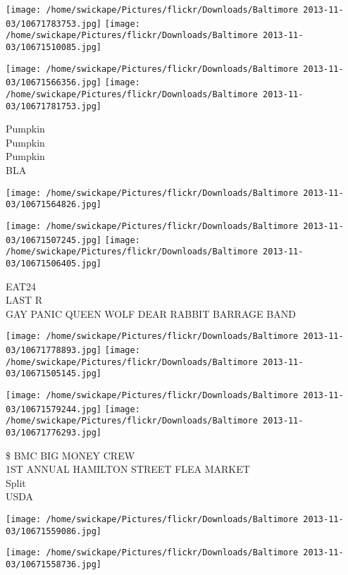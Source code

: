 \documentclass[10pt,letterpaper]{article}
\begin{document}
\texttt{[image: /home/swickape/Pictures/flickr/Downloads/Baltimore 2013-11-03/10671783753.jpg]}
\texttt{[image: /home/swickape/Pictures/flickr/Downloads/Baltimore 2013-11-03/10671510085.jpg]}

\texttt{[image: /home/swickape/Pictures/flickr/Downloads/Baltimore 2013-11-03/10671566356.jpg]}
\texttt{[image: /home/swickape/Pictures/flickr/Downloads/Baltimore 2013-11-03/10671781753.jpg]}

Pumpkin\\
Pumpkin\\
Pumpkin\\
BLA\\
\pagebreak

\texttt{[image: /home/swickape/Pictures/flickr/Downloads/Baltimore 2013-11-03/10671564826.jpg]}

\vspace{0.25in}
\texttt{[image: /home/swickape/Pictures/flickr/Downloads/Baltimore 2013-11-03/10671507245.jpg]}
\texttt{[image: /home/swickape/Pictures/flickr/Downloads/Baltimore 2013-11-03/10671506405.jpg]}

EAT24\\
LAST R\\
GAY PANIC QUEEN WOLF DEAR RABBIT BARRAGE BAND\\
\pagebreak

\texttt{[image: /home/swickape/Pictures/flickr/Downloads/Baltimore 2013-11-03/10671778893.jpg]}
\texttt{[image: /home/swickape/Pictures/flickr/Downloads/Baltimore 2013-11-03/10671505145.jpg]}

\texttt{[image: /home/swickape/Pictures/flickr/Downloads/Baltimore 2013-11-03/10671579244.jpg]}
\texttt{[image: /home/swickape/Pictures/flickr/Downloads/Baltimore 2013-11-03/10671776293.jpg]}

\$ BMC BIG MONEY CREW\\
1ST ANNUAL HAMILTON STREET FLEA MARKET\\
Split\\
USDA\\
\pagebreak

\texttt{[image: /home/swickape/Pictures/flickr/Downloads/Baltimore 2013-11-03/10671559086.jpg]}

\vspace{0.25in}
\texttt{[image: /home/swickape/Pictures/flickr/Downloads/Baltimore 2013-11-03/10671558736.jpg]}
\end{document}
